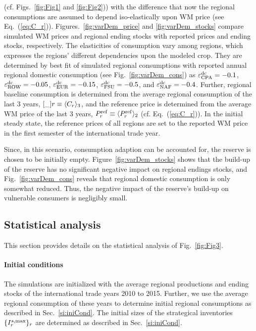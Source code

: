 (cf. Figs.~\ref{fig:Fig1} and \ref{fig:Fig2})) with the difference that now the regional
consumptions are assumed to depend iso-elastically upon WM price (see
Eq.~(\ref{eq:C_r})). Figures.~\ref{fig:varDem_price} and \ref{fig:varDem_stocks} compare simulated
WM prices and regional ending stocks with reported prices and ending stocks, respectively. The
elasticities of consumption vary among regions, which expresses the regions' different dependencies
upon the modeled crop. They are determined by best fit of simulated regional consumptions with
reported annual regional domestic consumption (see Fig.~\ref{fig:varDem_cons}) as
$\varepsilon^{\operatorname{dc}}_{\operatorname{CPA}}=-0.1$, $\varepsilon^{\operatorname{dc}}_{\operatorname{ROW}}=-0.05$, $\varepsilon^{\operatorname{dc}}_{\operatorname{EUR}}=-0.15$, $\varepsilon^{\operatorname{dc}}_{\operatorname{FSU}}=-0.5$, and $\varepsilon^{\operatorname{dc}}_{\operatorname{NAF}}=-0.4$.  Further,
regional baseline consumption is determined from the average regional consumption of the last 3
years, $\Cref_r\equiv \langle C_r\rangle_3$, and the reference price is determined from the average
WM price of the last 3 years, $P^{\operatorname{ref}}_r\equiv \langle P^{\operatorname{ref}}_r\rangle_2$
(cf. Eq.~(\ref{eq:C_r})). In the initial steady state, the reference prices of all regions are set
to the reported WM price in the first semester of the international trade year.

Since, in this scenario, consumption adaption can be accounted for, the
reserve is chosen to be initially empty. Figure~\ref{fig:varDem_stocks} shows
that the build-up of the reserve has no significant negative impact on regional
endings stocks, and Fig.~\ref{fig:varDem_cons} reveals that regional domestic
consumption is only somewhat reduced. Thus, the negative impact of the reserve's build-up on vulnerable consumers is negligibly small.


\subsection{Statistical analysis}
\label{sec:artiTs}
This section provides details on the statistical analysis of Fig.~\ref{fig:Fig3}.

\paragraph{Initial conditions}
The simulations are initialized with the average regional productions and ending stocks of the
international trade years 2010 to 2015. Further, we use the average regional consumption of these
years to determine initial regional consumptions as described in Sec.~\ref{si:iniCond}. The initial
sizes of the strategical inventories $\lbrace I^{s,\operatorname{max}}_r\rbrace_r$ are determined as described in
Sec.~\ref{si:iniCond}.

